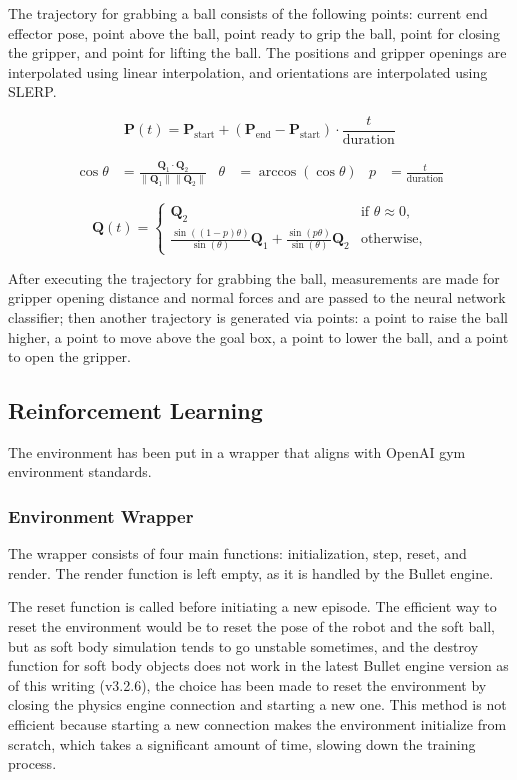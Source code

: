\noindent
The trajectory for grabbing a ball consists of the following points: current end effector pose, point above the ball, point ready to grip the ball, point for closing the gripper, and point for lifting the ball. The positions and gripper openings are interpolated using linear interpolation, and orientations are interpolated using SLERP.

\begin{equation}
\mathbf{P}(t) = \mathbf{P}_\text{start} + \left(\mathbf{P}_\text{end} - \mathbf{P}_\text{start}\right) \cdot \frac{t}{\text{duration}}
\label{eq:linear_interpolation}
\end{equation}

\begin{align*}
\cos\theta &= \frac{\mathbf{Q}_1 \cdot \mathbf{Q}_2}{\|\mathbf{Q}_1\| \|\mathbf{Q}_2\|} &
\theta &= \arccos(\cos\theta) & 
p &= \frac{t}{\text{duration}}
\end{align*}

\begin{equation}
\mathbf{Q}(t) = 
\begin{cases} 
\mathbf{Q}_2 & \text{if } \theta \approx 0, \\
\frac{\sin((1 - p) \theta)}{\sin(\theta)} \mathbf{Q}_1 + \frac{\sin(p \theta)}{\sin(\theta)} \mathbf{Q}_2 & \text{otherwise},
\end{cases}
\end{equation}

\noindent
After executing the trajectory for grabbing the ball, measurements are made for gripper opening distance and normal forces and are passed to the neural network classifier; then another trajectory is generated via points: a point to raise the ball higher, a point to move above the goal box, a point to lower the ball, and a point to open the gripper.

\subsection{Reinforcement Learning}
The environment has been put in a wrapper that aligns with OpenAI gym environment standards. 
\subsubsection{Environment Wrapper}
The wrapper consists of four main functions: initialization, step, reset, and render. The render function is left empty, as it is handled by the Bullet engine.

\bigskip \noindent
The reset function is called before initiating a new episode. The efficient way to reset the environment would be to reset the pose of the robot and the soft ball, but as soft body simulation tends to go unstable sometimes, and the destroy function for soft body objects does not work in the latest Bullet engine version as of this writing (v3.2.6), the choice has been made to reset the environment by closing the physics engine connection and starting a new one. This method is not efficient because starting a new connection makes the environment initialize from scratch, which takes a significant amount of time, slowing down the training process.

